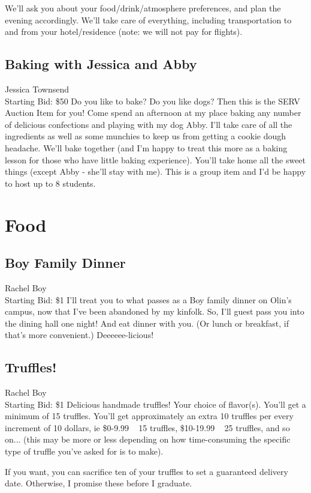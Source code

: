 \documentclass[11pt]{article}
\begin{document}
We'll ask you about your food/drink/atmosphere preferences, and plan the evening accordingly. We'll take care of everything, including transportation to and from your hotel/residence (note: we will not pay for flights).
\subsection{Baking with Jessica and Abby}
Jessica Townsend
\\
Starting Bid: \$50
\newline
Do you like to bake? Do you like dogs? Then this is the SERV Auction Item for you! Come spend an afternoon at my place baking any number of delicious confections and playing with my dog Abby. I'll take care of all the ingredients as well as some munchies to keep us from getting a cookie dough headache. We'll bake together (and I'm happy to treat this more as a baking lesson for those who have little baking experience). You'll take home all the sweet things (except Abby - she'll stay with me). This is a group item and I'd be happy to host up to 8 students.
\section{Food}
\subsection{Boy Family Dinner}
Rachel Boy
\\
Starting Bid: \$1
\newline
I'll treat you to what passes as a Boy family dinner on Olin's campus, now that I've been abandoned by my kinfolk.  So, I'll guest pass you into the dining hall one night!  And eat dinner with you. (Or lunch or breakfast, if that's more convenient.)  Deeeeee-licious!
\subsection{Truffles!}
Rachel Boy
\\
Starting Bid: \$1
\newline
Delicious handmade truffles! Your choice of flavor(s). You'll get a minimum of 15 truffles. You'll get approximately an extra 10 truffles per every increment of 10 dollars, ie \$0-9.99 ~ 15 truffles, \$10-19.99 ~ 25 truffles, and so on... (this may be more or less depending on how time-consuming the specific type of truffle you've asked for is to make). 

If you want, you can sacrifice ten of your truffles to set a guaranteed delivery date.  Otherwise, I promise these before I graduate.
\end{document}
